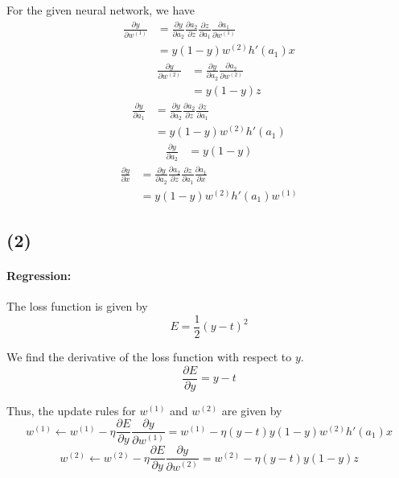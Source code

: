 \documentclass[a4paper,12pt]{article}
\newcommand{\pard}[2]{\frac{\partial #1}{\partial #2}}
\begin{document}
For the given neural network, we have
\begin{align*}
	\pard{y}{w^{(1)}} &= \pard{y}{a_2} \pard{a_2}{z} \pard{z}{a_1} \pard{a_1}{w^{(1)}} \\
	&= y (1 - y) w^{(2)} h'(a_1) x
\end{align*}
\begin{align*}
	\pard{y}{w^{(2)}} &= \pard{y}{a_2} \pard{a_2}{w^{(2)}} \\
	&= y (1 - y) z
\end{align*}
\begin{align*}
	\pard{y}{a_1} &= \pard{y}{a_2} \pard{a_2}{z} \pard{z}{a_1} \\
	&= y (1 - y) w^{(2)} h'(a_1)
\end{align*}
\begin{align*}
	\pard{y}{a_2} &= y (1 - y)
\end{align*}
\begin{align*}
	\pard{y}{x} &= \pard{y}{a_2} \pard{a_2}{z} \pard{z}{a_1} \pard{a_1}{x} \\
	&= y (1 - y) w^{(2)} h'(a_1) w^{(1)}
\end{align*}

\subsection*{(2)}

\paragraph{Regression:}

The loss function is given by
\begin{equation*}
	E = \frac{1}{2} (y - t)^2
\end{equation*}

We find the derivative of the loss function with respect to $y$.
\begin{equation*}
	\pard{E}{y} = y - t
\end{equation*}

Thus, the update rules for $w^{(1)}$ and $w^{(2)}$ are given by
\begin{equation*}
	w^{(1)} \leftarrow w^{(1)} - \eta \pard{E}{y} \pard{y}{w^{(1)}} = w^{(1)} - \eta (y - t) y (1 - y) w^{(2)} h'(a_1) x
\end{equation*}
\begin{equation*}
	w^{(2)} \leftarrow w^{(2)} - \eta \pard{E}{y} \pard{y}{w^{(2)}} = w^{(2)} - \eta (y - t) y (1 - y) z
\end{equation*}
\end{document}

